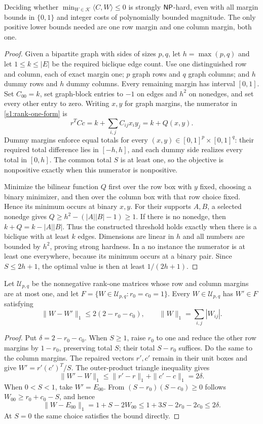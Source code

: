 \begin{theorem}\label{app:margin-hardness}
Deciding whether $\min_{W\in\mathcal K}\langle C,W\rangle\le0$ is
strongly $\mathsf{NP}$-hard, even with all margin bounds in $\{0,1\}$ and
integer costs of polynomially bounded magnitude. The only positive
lower bounds needed are one row margin and one column margin, both one.
\end{theorem}
\begin{proof}
Given a bipartite graph with sides of sizes $p,q$, let
$h=\max(p,q)$ and let $1\le k\le|E|$ be the required biclique edge
count. Use one distinguished row and column, each of exact margin one;
$p$ graph rows and $q$ graph columns; and $h$ dummy rows and $h$ dummy
columns. Every remaining margin has interval $[0,1]$. Set $C_{00}=k$,
set graph-block entries to $-1$ on edges and $h^2$ on nonedges, and
set every other entry to zero. Writing $x,y$ for graph margins,
the numerator in \eqref{s1:rank-one-form} is
\[
 r^TCc=k+\sum_{i,j}C_{ij}x_i y_j=k+Q(x,y).
\]
Dummy margins enforce equal totals for every
$(x,y)\in[0,1]^p\times[0,1]^q$: their required total difference lies
in $[-h,h]$, and each dummy side realizes every total in $[0,h]$.
The common total $S$ is at least one, so the objective is nonpositive
exactly when this numerator is nonpositive.

Minimize the bilinear function $Q$ first over the row box with $y$
fixed, choosing a binary minimizer, and then over the column box with
that row choice fixed. Hence its minimum occurs at binary $x,y$.
For their supports $A,B$, a selected nonedge gives
$Q\ge h^2-(|A||B|-1)\ge1$. If there is no nonedge, then
$k+Q=k-|A||B|$. Thus the constructed threshold holds exactly when
there is a biclique with at least $k$ edges. Dimensions are linear in
$h$ and all numbers are bounded by $h^2$, proving strong hardness.
In a no instance the numerator is at least one everywhere, because
its minimum occurs at a binary pair. Since $S\le2h+1$, the optimal
value is then at least $1/(2h+1)$.
\end{proof}

\begin{lemma}\label{app:unit-repair}
Let $\mathcal U_{p,q}$ be the nonnegative rank-one matrices whose row
and column margins are at most one, and let
$F=\{W\in\mathcal U_{p,q}:r_0=c_0=1\}$. Every
$W\in\mathcal U_{p,q}$ has $W'\in F$ satisfying
\[
 \|W-W'\|_1\le2(2-r_0-c_0),
 \qquad \|W\|_1=\sum_{i,j}|W_{ij}|.
\]
\end{lemma}
\begin{proof}
Put $\delta=2-r_0-c_0$. When $S\ge1$, raise $r_0$ to one and
reduce the other row margins by $1-r_0$, preserving total $S$;
their total $S-r_0$ suffices. Do the same to the column margins.
The repaired vectors $r',c'$ remain in their unit boxes and give
$W'=r'(c')^T/S$. The outer-product triangle inequality gives
\[
 \|W'-W\|_1\le\|r'-r\|_1+\|c'-c\|_1=2\delta.
\]
When $0<S<1$, take $W'=E_{00}$. From
$(S-r_0)(S-c_0)\ge0$ follows $W_{00}\ge r_0+c_0-S$, and hence
\[
 \|W-E_{00}\|_1=1+S-2W_{00}
 \le1+3S-2r_0-2c_0\le2\delta.
\]
At $S=0$ the same choice satisfies the bound directly.
\end{proof}

